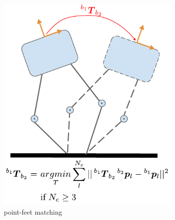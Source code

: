\begin{figure}
    \centering
    \begin{subfigure}{.33\linewidth}
        \centering
        \includegraphics[width=\textwidth]{figures/robot_kinematic_types_point_matching.pdf}
        \caption{point-feet matching}
        \label{fig:kin_point_matching}
    \end{subfigure}%
    \hfill
    \begin{subfigure}{.33\linewidth}
        \centering

\end{subfigure}
\end{figure}
